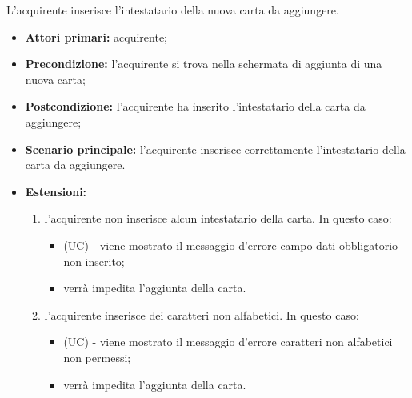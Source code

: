 \resetSubSubUC

L'acquirente inserisce l'intestatario della nuova carta da aggiungere.
\begin{itemize}
    \item \textbf{Attori primari:} acquirente;
    \item \textbf{Precondizione:} l'acquirente si trova nella schermata di aggiunta di una nuova carta;
    \item \textbf{Postcondizione:} l'acquirente ha inserito l'intestatario della carta da aggiungere;
    \item \textbf{Scenario principale:} l'acquirente inserisce correttamente l'intestatario della carta da aggiungere.
    \item \textbf{Estensioni:}
    \begin{enumerate}[label=\lett]
        \item l'acquirente non inserisce alcun intestatario della carta. In questo caso:
        \begin{itemize}
            \item (UC) - viene mostrato il messaggio d'errore campo dati obbligatorio non inserito;
            \item verrà impedita l'aggiunta della carta.
        \end{itemize}
        \item l'acquirente inserisce dei caratteri non alfabetici. In questo caso:
        \begin{itemize}
            \item (UC) - viene mostrato il messaggio d'errore caratteri non alfabetici non permessi;
            \item verrà impedita l'aggiunta della carta.
        \end{itemize}
    \end{enumerate}
\end{itemize}

